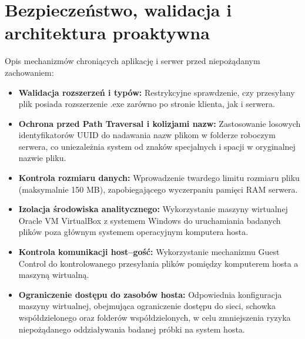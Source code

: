 \documentclass{article}
\begin{document}
\section{Bezpieczeństwo, walidacja i architektura proaktywna}
\label{sec:bezpieczenstwo}
Opis mechanizmów chroniących aplikację i serwer przed niepożądanym zachowaniem:
\begin{itemize}
\item \textbf{Walidacja rozszerzeń i typów:} Restrykcyjne sprawdzenie, czy przesyłany plik posiada rozszerzenie .exe zarówno po stronie klienta, jak i serwera.
\item \textbf{Ochrona przed Path Traversal i kolizjami nazw:} Zastosowanie losowych identyfikatorów UUID do nadawania nazw plikom w folderze roboczym serwera, co uniezależnia system od znaków specjalnych i spacji w oryginalnej nazwie pliku.
\item \textbf{Kontrola rozmiaru danych:} Wprowadzenie twardego limitu rozmiaru pliku (maksymalnie 150 MB), zapobiegającego wyczerpaniu pamięci RAM serwera.
\item \textbf{Izolacja środowiska analitycznego:} Wykorzystanie maszyny wirtualnej Oracle VM VirtualBox z systemem Windows do uruchamiania badanych plików poza głównym systemem operacyjnym komputera hosta.
\item \textbf{Kontrola komunikacji host--gość:} Wykorzystanie mechanizmu Guest Control do kontrolowanego przesyłania plików pomiędzy komputerem hosta a maszyną wirtualną.
\item \textbf{Ograniczenie dostępu do zasobów hosta:} Odpowiednia konfiguracja maszyny wirtualnej, obejmująca ograniczenie dostępu do sieci, schowka współdzielonego oraz folderów współdzielonych, w celu zmniejszenia ryzyka niepożądanego oddziaływania badanej próbki na system hosta.
\end{itemize}
\end{document}
